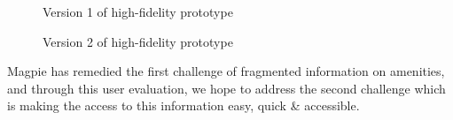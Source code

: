 \documentclass{report}
\begin{document}
\begin{figure}
    \begin{minipage}{0.45\textwidth}
        \centering
        \caption{Version 1 of high-fidelity prototype}
        \label{fig:plot7}
    \end{minipage}
    \hfill
    \begin{minipage}{0.45\textwidth}
        \centering
        \caption{Version 2 of high-fidelity prototype}
        \label{fig:plot8}
    \end{minipage}
\end{figure}

\noindent{}Magpie has remedied the first challenge of fragmented information on
amenities, and through this user evaluation, we hope to address the second challenge
which is making the access to this information easy, quick \& accessible.
\end{document}

